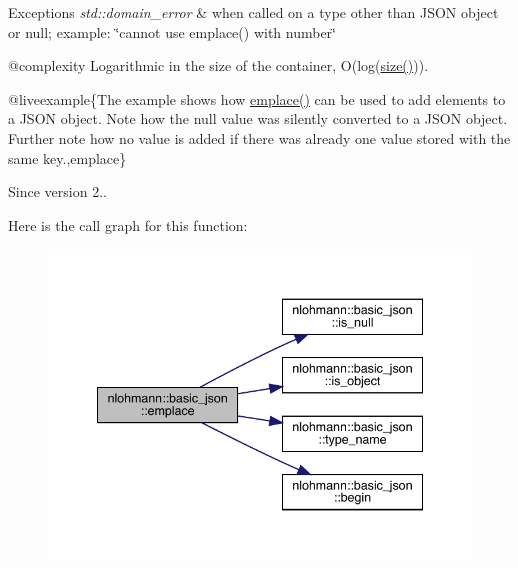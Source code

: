 \begin{DoxyExceptions}{Exceptions}
{\em std\+::domain\+\_\+error} & when called on a type other than J\+S\+ON object or null; example\+: {\ttfamily \char`\"{}cannot use emplace() with number\char`\"{}}\\
\hline
\end{DoxyExceptions}
@complexity Logarithmic in the size of the container, O(log({\ttfamily \mbox{\hyperlink{classnlohmann_1_1basic__json_a25e27ad0c6d53c01871c5485e1f75b96}{size()}}})).

@liveexample\{The example shows how {\ttfamily \mbox{\hyperlink{classnlohmann_1_1basic__json_a5338e282d1d02bed389d852dd670d98d}{emplace()}}} can be used to add elements to a J\+S\+ON object. Note how the {\ttfamily null} value was silently converted to a J\+S\+ON object. Further note how no value is added if there was already one value stored with the same key.,emplace\}

\begin{DoxySince}{Since}
version 2.. 
\end{DoxySince}
Here is the call graph for this function\+:
\nopagebreak
\begin{figure}[H]
\begin{center}
\leavevmode
\includegraphics[width=341pt]{classnlohmann_1_1basic__json_a5338e282d1d02bed389d852dd670d98d_cgraph}
\end{center}
\end{figure}
\mbox{\label{classnlohmann_1_1basic__json_aacf5eed15a8b66fb1e88910707a5e229}} 
